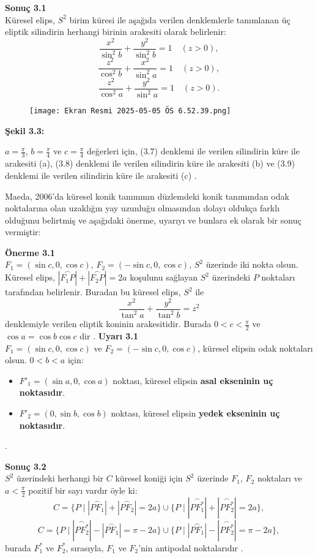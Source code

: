 \documentclass[a4paper,12pt]{article}
\begin{document}
\textbf{Sonuç 3.1} \\
Küresel elips, $S^2$ birim küresi ile aşağıda verilen denklemlerle tanımlanan üç eliptik silindirin herhangi birinin arakesiti olarak belirlenir:
\[
\frac{x^2}{\sin^2 b} + \frac{y^2}{\sin^2 b} = 1 \quad (z > 0), \tag{3.7}
\]
\[
\frac{z^2}{\cos^2 b} + \frac{x^2}{\sin^2 a} = 1 \quad (z > 0), \tag{3.8}
\]
\[
\frac{z^2}{\cos^2 a} + \frac{y^2}{\sin^2 a} = 1 \quad (z > 0). \tag{3.9}
\]
\begin{figure}
    \centering
    \texttt{[image: Ekran Resmi 2025-05-05 ÖS 6.52.39.png]}
\end{figure}
\textbf{Şekil 3.3:} 


$a = \frac{\pi}{3}$, $b = \frac{\pi}{4}$ ve $c = \frac{\pi}{4}$ değerleri için, (3.7) denklemi ile verilen silindirin küre ile arakesiti (a), (3.8) denklemi ile verilen silindirin küre ile arakesiti (b) ve (3.9) denklemi ile verilen silindirin küre ile arakesiti (c)   .

Maeda, 2006’da küresel konik tanımının düzlemdeki konik tanımından odak noktalarına olan uzaklığın yay uzunluğu olmasından dolayı oldukça farklı olduğunu belirtmiş ve aşağıdaki önerme, uyarıyı ve bunlara ek olarak bir sonuç vermiştir:

\textbf{Önerme 3.1} \\
$F_1 = (\sin c, 0, \cos c)$, $F_2 = (-\sin c, 0, \cos c)$, $S^2$ üzerinde iki nokta olsun. Küresel elips, $|\overset{\frown}{F_1P}| + |\overset{\frown}{F_2P}| = 2a$ koşulunu sağlayan $S^2$ üzerindeki $P$ noktaları tarafından belirlenir. Buradan bu küresel elips, $S^2$ ile
\[
\frac{x^2}{\tan^2 a} + \frac{y^2}{\tan^2 b} = z^2
\]
denklemiyle verilen eliptik koninin arakesitidir. Burada $0 < c < \frac{\pi}{2}$ ve $\cos a = \cos b \cos c$ dir   .
\textbf{Uyarı 3.1} \\
$F_1 = (\sin c, 0, \cos c)$ ve $F_2 = (-\sin c, 0, \cos c)$, küresel elipsin odak noktaları olsun. $0 < b < a$ için:
\begin{itemize}
    \item $F'_1 = (\sin a, 0, \cos a)$ noktası, küresel elipsin \textbf{asal ekseninin uç noktasıdır}.
    \item $F'_2 = (0, \sin b, \cos b)$ noktası, küresel elipsin \textbf{yedek ekseninin uç noktasıdır}.
\end{itemize}
  .

\textbf{Sonuç 3.2} \\
$S^2$ üzerindeki herhangi bir $C$ küresel koniği için $S^2$ üzerinde $F_1$, $F_2$ noktaları ve $a < \frac{\pi}{2}$ pozitif bir sayı vardır öyle ki:
\[
C = \{P \mid |\overset{\frown}{PF_1}| + |\overset{\frown}{PF_2}| = 2a\} \cup \{P \mid |\overset{\frown}{PF^*_1}| + |\overset{\frown}{PF^*_2}| = 2a\},
\]
\[
C = \{P \mid |\overset{\frown}{PF^*_2}| - |\overset{\frown}{PF_1}| = \pi - 2a\} \cup \{P \mid |\overset{\frown}{PF_1}| - |\overset{\frown}{PF^*_2}| = \pi - 2a\},
\]
burada $F^*_1$ ve $F^*_2$, sırasıyla, $F_1$ ve $F_2$'nin antipodal noktalarıdır   .
\end{document}
